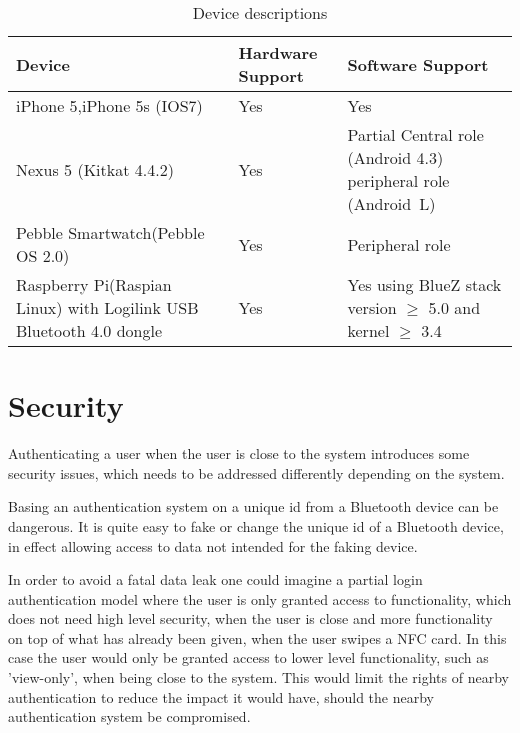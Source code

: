 \begin{table}
\label{table:devices}
\centering
\begin{tabular}{|p{4cm}|p{4cm}|p{5cm}|}
\hline
\textbf{Device} & \textbf{Hardware Support} & \textbf{Software Support}\\
\hline
iPhone 5,\newline iPhone 5s (IOS7) & Yes & Yes\\
\hline
Nexus 5 \newline (Kitkat 4.4.2) & Yes & Partial \newline
Central role (Android 4.3)  \newline
peripheral role (Android~L)\\
\hline
Pebble Smartwatch\newline (Pebble OS 2.0) & Yes & Peripheral role\\
\hline
Raspberry Pi\newline (Raspian Linux) with Logilink USB Bluetooth 4.0 dongle & Yes & Yes using BlueZ stack version $\geq$ 5.0 and kernel $\geq$ 3.4\\
\hline

\end{tabular}
\caption{Device descriptions}

\end{table}


\section{Security}

Authenticating a user when the user is close to the system introduces some security issues, which needs to be addressed differently depending on the system.

Basing an authentication system on a unique id from a Bluetooth device can be dangerous. It is quite easy to fake or change the unique id of a Bluetooth device, in effect allowing access to data not intended for the faking device.

In order to avoid a fatal data leak one could imagine a partial login authentication model\cite{ref:covington} where the user is only granted access to functionality, which does not need high level security, when the user is close and more functionality on top of what has already been given, when the user swipes a NFC card.
In this case the user would only be granted access to lower level functionality, such as 'view-only', when being close to the system. This would limit the rights of nearby authentication to reduce the impact it would have, should the nearby authentication system be compromised.


